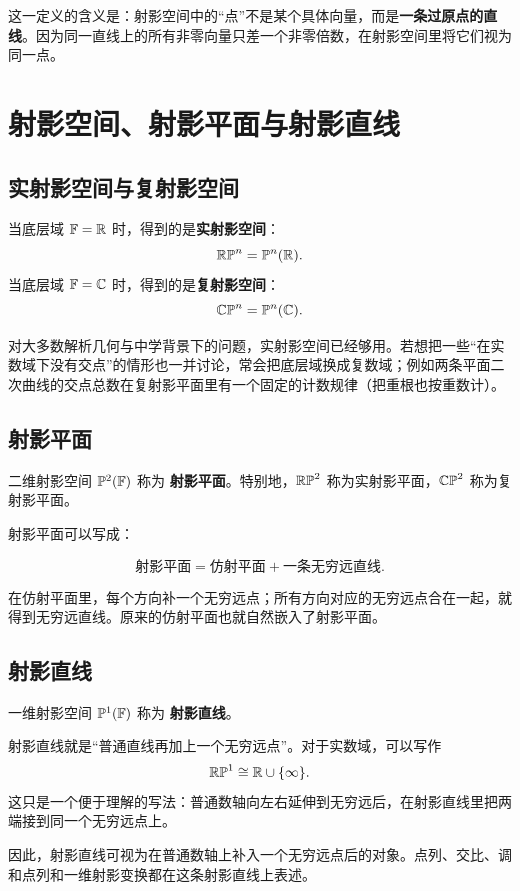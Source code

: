 这一定义的含义是：射影空间中的“点”不是某个具体向量，而是\textbf{一条过原点的直线}。因为同一直线上的所有非零向量只差一个非零倍数，在射影空间里将它们视为同一点。

\section{射影空间、射影平面与射影直线}

\subsection{实射影空间与复射影空间}
当底层域 $\mathbb{F}=\mathbb{R}$ 时，得到的是\textbf{实射影空间}：
\[
\mathbb{RP}^n=\mathbb{P}^n(\mathbb{R}).
\]
当底层域 $\mathbb{F}=\mathbb{C}$ 时，得到的是\textbf{复射影空间}：
\[
\mathbb{CP}^n=\mathbb{P}^n(\mathbb{C}).
\]

对大多数解析几何与中学背景下的问题，实射影空间已经够用。若想把一些“在实数域下没有交点”的情形也一并讨论，常会把底层域换成复数域；例如两条平面二次曲线的交点总数在复射影平面里有一个固定的计数规律（把重根也按重数计）。

\subsection{射影平面}
\begin{definition}
二维射影空间 $\mathbb{P}^2(\mathbb{F})$ 称为 \textbf{射影平面}。特别地，$\mathbb{RP}^2$ 称为实射影平面，$\mathbb{CP}^2$ 称为复射影平面。
\end{definition}

射影平面可以写成：

\[
\text{射影平面}=\text{仿射平面}+\text{一条无穷远直线}.
\]

在仿射平面里，每个方向补一个无穷远点；所有方向对应的无穷远点合在一起，就得到无穷远直线。原来的仿射平面也就自然嵌入了射影平面。

\subsection{射影直线}
\begin{definition}
一维射影空间 $\mathbb{P}^1(\mathbb{F})$ 称为 \textbf{射影直线}。
\end{definition}

射影直线就是“普通直线再加上一个无穷远点”。对于实数域，可以写作
\[
\mathbb{RP}^1 \cong \mathbb{R}\cup\{\infty\}.
\]
这只是一个便于理解的写法：普通数轴向左右延伸到无穷远后，在射影直线里把两端接到同一个无穷远点上。

因此，射影直线可视为在普通数轴上补入一个无穷远点后的对象。点列、交比、调和点列和一维射影变换都在这条射影直线上表述。

